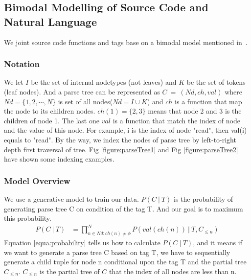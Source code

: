 \subsection{Bimodal Modelling of Source Code and Natural Language}

We joint source code functions and tags base on a bimodal model mentioned in~\cite{allamanis2015bimodal}.

\subsubsection{Notation}
We let $I$ be the set of internal nodetypes (not leaves) and $K$ be the set of tokens (leaf nodes). And a parse tree can be represented as $C\ =\ (Nd,ch,val)$ where $Nd=\{1,2,\cdots,N\}$ is set of all nodes($Nd=I\cup K$) and $ch$ is a function that map the node to its children nodes. $ch(1)=\{2,3\}$ means that node 2 and 3 is the children of node 1. The last one $val$ is a function that match the index of node and the value of this node. For example, i is the index of node "read", then val(i) equals to "read". By the way, we index the nodes of parse tree by left-to-right depth first traversal of tree. Fig \ref{figure:parseTree1} and Fig \ref{figure:parseTree2} have shown some indexing examples.
\subsubsection{Model Overview}
We use a generative model to train our data. $P(C\ |\ T)$ is the probability of generating parse tree C on condition of the tag T. And our goal is to maximum this probability.
\begin{align}
    P(C\ |\ T) & = \prod_{n\in Nd:ch(n)\neq\phi}^N P(val(ch(n))\ |\ T,C_{\leq n}) \label{equa:probability}
\end{align}
Equation \ref{equa:probability} tells us how to calculate $P(C\ |\ T)$, and it means if we want to generate a parse tree C based on tag T, we have to sequentially generate a child tuple for node n conditional upon the tag T and the partial tree $C_{\leq n}$. $C_{\leq n}$ is the partial tree of $C$ that the index of all nodes are less than n.

